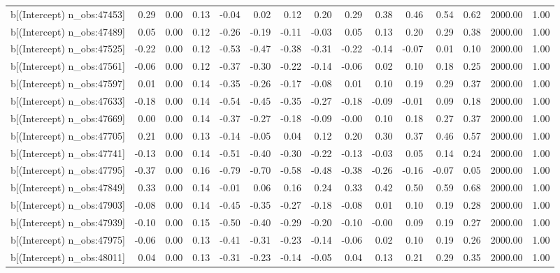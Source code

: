 \begin{table}[ht]
\begin{tabular}{rrrrrrrrrrrrrrr}
  b[(Intercept) n\_obs:47453] & 0.29 & 0.00 & 0.13 & -0.04 & 0.02 & 0.12 & 0.20 & 0.29 & 0.38 & 0.46 & 0.54 & 0.62 & 2000.00 & 1.00 \\ 
  b[(Intercept) n\_obs:47489] & 0.05 & 0.00 & 0.12 & -0.26 & -0.19 & -0.11 & -0.03 & 0.05 & 0.13 & 0.20 & 0.29 & 0.38 & 2000.00 & 1.00 \\ 
  b[(Intercept) n\_obs:47525] & -0.22 & 0.00 & 0.12 & -0.53 & -0.47 & -0.38 & -0.31 & -0.22 & -0.14 & -0.07 & 0.01 & 0.10 & 2000.00 & 1.00 \\ 
  b[(Intercept) n\_obs:47561] & -0.06 & 0.00 & 0.12 & -0.37 & -0.30 & -0.22 & -0.14 & -0.06 & 0.02 & 0.10 & 0.18 & 0.25 & 2000.00 & 1.00 \\ 
  b[(Intercept) n\_obs:47597] & 0.01 & 0.00 & 0.14 & -0.35 & -0.26 & -0.17 & -0.08 & 0.01 & 0.10 & 0.19 & 0.29 & 0.37 & 2000.00 & 1.00 \\ 
  b[(Intercept) n\_obs:47633] & -0.18 & 0.00 & 0.14 & -0.54 & -0.45 & -0.35 & -0.27 & -0.18 & -0.09 & -0.01 & 0.09 & 0.18 & 2000.00 & 1.00 \\ 
  b[(Intercept) n\_obs:47669] & 0.00 & 0.00 & 0.14 & -0.37 & -0.27 & -0.18 & -0.09 & -0.00 & 0.10 & 0.18 & 0.27 & 0.37 & 2000.00 & 1.00 \\ 
  b[(Intercept) n\_obs:47705] & 0.21 & 0.00 & 0.13 & -0.14 & -0.05 & 0.04 & 0.12 & 0.20 & 0.30 & 0.37 & 0.46 & 0.57 & 2000.00 & 1.00 \\ 
  b[(Intercept) n\_obs:47741] & -0.13 & 0.00 & 0.14 & -0.51 & -0.40 & -0.30 & -0.22 & -0.13 & -0.03 & 0.05 & 0.14 & 0.24 & 2000.00 & 1.00 \\ 
  b[(Intercept) n\_obs:47795] & -0.37 & 0.00 & 0.16 & -0.79 & -0.70 & -0.58 & -0.48 & -0.38 & -0.26 & -0.16 & -0.07 & 0.05 & 2000.00 & 1.00 \\ 
  b[(Intercept) n\_obs:47849] & 0.33 & 0.00 & 0.14 & -0.01 & 0.06 & 0.16 & 0.24 & 0.33 & 0.42 & 0.50 & 0.59 & 0.68 & 2000.00 & 1.00 \\ 
  b[(Intercept) n\_obs:47903] & -0.08 & 0.00 & 0.14 & -0.45 & -0.35 & -0.27 & -0.18 & -0.08 & 0.01 & 0.10 & 0.19 & 0.28 & 2000.00 & 1.00 \\ 
  b[(Intercept) n\_obs:47939] & -0.10 & 0.00 & 0.15 & -0.50 & -0.40 & -0.29 & -0.20 & -0.10 & -0.00 & 0.09 & 0.19 & 0.27 & 2000.00 & 1.00 \\ 
  b[(Intercept) n\_obs:47975] & -0.06 & 0.00 & 0.13 & -0.41 & -0.31 & -0.23 & -0.14 & -0.06 & 0.02 & 0.10 & 0.19 & 0.26 & 2000.00 & 1.00 \\ 
  b[(Intercept) n\_obs:48011] & 0.04 & 0.00 & 0.13 & -0.31 & -0.23 & -0.14 & -0.05 & 0.04 & 0.13 & 0.21 & 0.29 & 0.35 & 2000.00 & 1.00 \\ 

\end{tabular}
\end{table}
